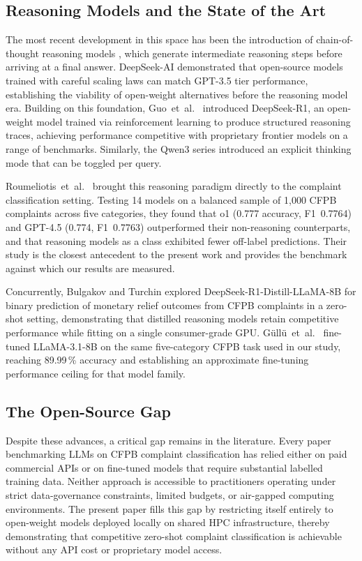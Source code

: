 \documentclass[journal]{IEEEtran}
\begin{document}
\subsection{Reasoning Models and the State of the Art}

The most recent development in this space has been the introduction of
chain-of-thought reasoning models \cite{wei2022chainofthought}, which
generate intermediate reasoning steps before arriving at a final answer.
DeepSeek-AI \cite{deepseekllm2024} demonstrated that open-source models
trained with careful scaling laws can match GPT-3.5 tier performance,
establishing the viability of open-weight alternatives before the
reasoning model era. Building on this foundation, Guo~et~al.\
\cite{guo2025deepseekr1} introduced DeepSeek-R1, an open-weight model
trained via reinforcement learning to produce structured reasoning
traces, achieving performance competitive with proprietary frontier
models on a range of benchmarks. Similarly, the
Qwen3 series \cite{qwen2025qwen3} introduced an explicit thinking mode
that can be toggled per query.

Roumeliotis~et~al.\ \cite{roumeliotis2025think} brought this reasoning
paradigm directly to the complaint classification setting. Testing
14 models on a balanced sample of 1,000 CFPB complaints across five
categories, they found that o1 (0.777 accuracy, F1~0.7764) and
GPT-4.5 (0.774, F1~0.7763) outperformed their non-reasoning
counterparts, and that reasoning models as a class exhibited fewer
off-label predictions. Their study is the closest antecedent to the
present work and provides the benchmark against which our results
are measured.

Concurrently, Bulgakov and Turchin \cite{bulgakov2026deepseek} explored
DeepSeek-R1-Distill-LLaMA-8B for binary prediction of monetary relief
outcomes from CFPB complaints in a zero-shot setting, demonstrating
that distilled reasoning models retain competitive performance while
fitting on a single consumer-grade GPU. G{\"u}ll{\"u}~et~al.\
\cite{gullu2025llama} fine-tuned LLaMA-3.1-8B on the same five-category
CFPB task used in our study, reaching 89.99\,\% accuracy and
establishing an approximate fine-tuning performance ceiling for that
model family.

\subsection{The Open-Source Gap}

Despite these advances, a critical gap remains in the literature. Every
paper benchmarking LLMs on CFPB complaint classification has relied
either on paid commercial APIs or on fine-tuned models that require
substantial labelled training data. Neither approach is accessible to
practitioners operating under strict data-governance constraints,
limited budgets, or air-gapped computing environments. The present
paper fills this gap by restricting itself entirely to open-weight
models deployed locally on shared HPC infrastructure, thereby
demonstrating that competitive zero-shot complaint classification is
achievable without any API cost or proprietary model access.
\end{document}
